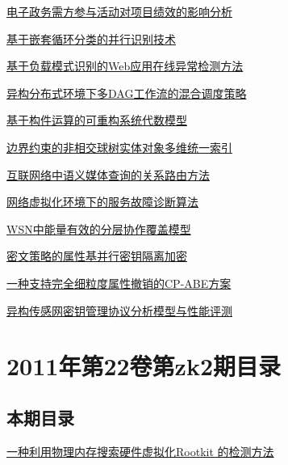 \documentclass[a4paper]{article}
\begin{document}
\href{http://www.jos.org.cn/ch/reader/download_pdf.aspx?file_no=4244&year_id=2012&quarter_id=10&falg=1}{电子政务需方参与活动对项目绩效的影响分析}

\href{http://www.jos.org.cn/ch/reader/download_pdf.aspx?file_no=4178&year_id=2012&quarter_id=10&falg=1}{基于嵌套循环分类的并行识别技术}

\href{http://www.jos.org.cn/ch/reader/download_pdf.aspx?file_no=4197&year_id=2012&quarter_id=10&falg=1}{基于负载模式识别的Web应用在线异常检测方法}

\href{http://www.jos.org.cn/ch/reader/download_pdf.aspx?file_no=4198&year_id=2012&quarter_id=10&falg=1}{异构分布式环境下多DAG工作流的混合调度策略}

\href{http://www.jos.org.cn/ch/reader/download_pdf.aspx?file_no=4170&year_id=2012&quarter_id=10&falg=1}{基于构件运算的可重构系统代数模型}

\href{http://www.jos.org.cn/ch/reader/download_pdf.aspx?file_no=4214&year_id=2012&quarter_id=10&falg=1}{边界约束的非相交球树实体对象多维统一索引}

\href{http://www.jos.org.cn/ch/reader/download_pdf.aspx?file_no=4176&year_id=2012&quarter_id=10&falg=1}{互联网络中语义媒体查询的关系路由方法}

\href{http://www.jos.org.cn/ch/reader/download_pdf.aspx?file_no=4171&year_id=2012&quarter_id=10&falg=1}{网络虚拟化环境下的服务故障诊断算法}

\href{http://www.jos.org.cn/ch/reader/download_pdf.aspx?file_no=4173&year_id=2012&quarter_id=10&falg=1}{WSN中能量有效的分层协作覆盖模型}

\href{http://www.jos.org.cn/ch/reader/download_pdf.aspx?file_no=4183&year_id=2012&quarter_id=10&falg=1}{密文策略的属性基并行密钥隔离加密}

\href{http://www.jos.org.cn/ch/reader/download_pdf.aspx?file_no=4184&year_id=2012&quarter_id=10&falg=1}{一种支持完全细粒度属性撤销的CP-ABE方案}

\href{http://www.jos.org.cn/ch/reader/download_pdf.aspx?file_no=4193&year_id=2012&quarter_id=10&falg=1}{异构传感网密钥管理协议分析模型与性能评测}


\section{\textbf{2011年第22卷第zk2期目录}}
\subsection{本期目录}
\href{http://www.jos.org.cn/ch/reader/download_pdf.aspx?file_no=11021&year_id=2011&quarter_id=zk2&falg=1}{一种利用物理内存搜索硬件虚拟化Rootkit 的检测方法}
\end{document}
